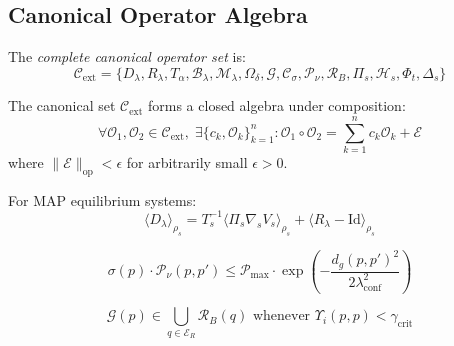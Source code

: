 \subsection{Canonical Operator Algebra}
\label{subsection:bk6_canonical_operator_algebra}

\begin{definition}
\label{definition:bk6_complete_canonical_set}
The \emph{complete canonical operator set} is:
\begin{equation}
\mathcal{C}_{\text{ext}} = \{D_\lambda, R_\lambda, T_\alpha, \mathcal{B}_\lambda, \mathcal{M}_\lambda, \Omega_\delta, \mathcal{G}, \mathcal{C}_\sigma, \mathcal{P}_\nu, \mathcal{R}_B, \Pi_s, \mathcal{H}_s, \Phi_t, \Delta_s\}
\end{equation}
\end{definition}

\begin{theorem}
\label{theorem:bk6_complete_operator_closure}
The canonical set $\mathcal{C}_{\text{ext}}$ forms a closed algebra under composition:
\begin{equation}
\forall \mathcal{O}_1, \mathcal{O}_2 \in \mathcal{C}_{\text{ext}}, \; \exists \{c_k, \mathcal{O}_k\}_{k=1}^n : \mathcal{O}_1 \circ \mathcal{O}_2 = \sum_{k=1}^n c_k \mathcal{O}_k + \mathcal{E}
\end{equation}
where $\|\mathcal{E}\|_{\text{op}} < \epsilon$ for arbitrarily small $\epsilon > 0$.
\end{theorem}

\begin{theorem}
\label{theorem:bk6_thermodynamic_map_duality}
For MAP equilibrium systems:
\begin{equation}
\langle D_\lambda \rangle_{\rho_s} = T_s^{-1} \langle \Pi_s \nabla_s V_s \rangle_{\rho_s} + \langle R_\lambda - \text{Id} \rangle_{\rho_s}
\end{equation}
\end{theorem}

\begin{theorem}
\label{theorem:bk6_confidence_power_bound}
\begin{equation}
\sigma(p) \cdot \mathcal{P}_\nu(p, p') \leq \mathcal{P}_{\max} \cdot \exp\left(-\frac{d_g(p,p')^2}{2\lambda_{\text{conf}}^2}\right)
\end{equation}
\end{theorem}

\begin{lemma}
\label{lemma:bk6_grace_basin_correspondence}
\begin{equation}
\mathcal{G}(p) \in \bigcup_{q \in \mathcal{E}_R} \mathcal{R}_B(q) \text{ whenever } \Upsilon_i(p,p) < \gamma_{\text{crit}}
\end{equation}
\end{lemma}


